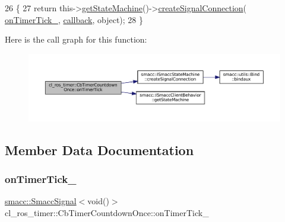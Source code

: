 \begin{DoxyCode}
26     \{
27         \textcolor{keywordflow}{return} this->\hyperlink{classsmacc_1_1ISmaccClientBehavior_a9d55a85bf0a920033805a3c050de2019}{getStateMachine}()->\hyperlink{classsmacc_1_1ISmaccStateMachine_adf0f42ade0c65cc471960fe2a7c42da2}{createSignalConnection}(
      \hyperlink{classcl__ros__timer_1_1CbTimerCountdownOnce_ac948b5efd5c9a397319668378463eadd}{onTimerTick\_}, \hyperlink{sm__ridgeback__barrel__search__1_2servers_2opencv__perception__node_2opencv__perception__node_8cpp_a050e697bd654facce10ea3f6549669b3}{callback}, \textcolor{keywordtype}{object});
28     \}
\end{DoxyCode}
Here is the call graph for this function\+:
\nopagebreak
\begin{figure}[H]
\begin{center}
\leavevmode
\includegraphics[width=350pt]{classcl__ros__timer_1_1CbTimerCountdownOnce_a1e20a8c9a9907db8a1d7dacf8c60ad27_cgraph}
\end{center}
\end{figure}


\subsection{Member Data Documentation}
\mbox{\label{classcl__ros__timer_1_1CbTimerCountdownOnce_ac948b5efd5c9a397319668378463eadd}} 
\subsubsection{\texorpdfstring{on\+Timer\+Tick\+\_\+}{onTimerTick\_}}
{\footnotesize\ttfamily \hyperlink{classsmacc_1_1SmaccSignal}{smacc\+::\+Smacc\+Signal}$<$void()$>$ cl\+\_\+ros\+\_\+timer\+::\+Cb\+Timer\+Countdown\+Once\+::on\+Timer\+Tick\+\_\+\hspace{0.3cm}{\ttfamily [private]}}



